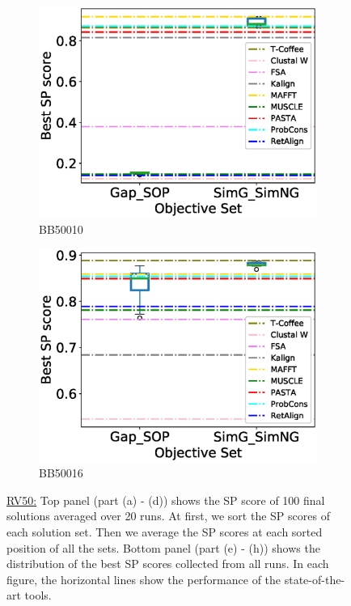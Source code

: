 \begin{figure}[!htbp]
\begin{adjustwidth}{-1.5cm}{-1cm}
\begin{subfigure}{0.22\textwidth}
			\includegraphics[width=\columnwidth]{Figure/summary/precomputedInit/Balibase/BB50010_objset_pairs_rank_2}
			\caption{BB50010}
		\end{subfigure}
		\begin{subfigure}{0.22\textwidth}
			\includegraphics[width=\columnwidth]{Figure/summary/precomputedInit/Balibase/BB50016_objset_pairs_rank_2}
			\caption{BB50016}
		\end{subfigure}
		\end{adjustwidth}
		\caption[SP score results on RV50]{\underline{RV50:} Top panel (part (a) - (d)) shows the SP score of 100 final solutions averaged over 20 runs. At first, we sort the SP scores of each solution set. Then we average the SP scores at each sorted position of all the sets. Bottom panel (part (e) - (h)) shows the distribution of the best SP scores collected from all runs. In each figure, the horizontal lines show the performance of the state-of-the-art tools.}
		\label{fig:rv50_sp}

\end{figure}

